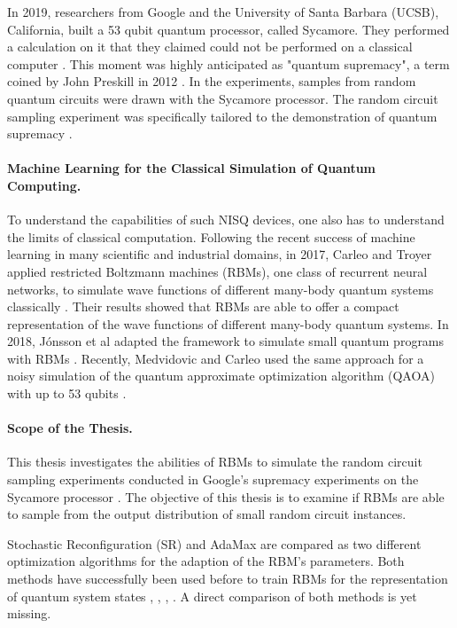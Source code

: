 In 2019, researchers from Google and the University of Santa Barbara (UCSB), California, built a 
53 qubit quantum processor, called Sycamore. They performed a calculation on it that they claimed could not be 
performed on a classical computer \cite{martines2019supremacy}. This moment was highly anticipated 
as "quantum supremacy", a term coined by John Preskill in 2012 \cite{preskill2012quantum}. In the experiments, 
samples from random quantum circuits were drawn with the Sycamore processor.
The random circuit sampling experiment was specifically tailored 
to the demonstration of quantum supremacy \cite{Boixo2018supremacy}.

\paragraph{Machine Learning for the Classical Simulation of Quantum Computing.}
To understand the capabilities of such NISQ devices, one also has to understand 
the limits of classical computation. Following the recent success of machine learning in 
many scientific and industrial domains, in 2017, Carleo and Troyer applied restricted Boltzmann machines (RBMs),
one class of recurrent neural networks,
to simulate wave functions of different many-body quantum systems classically \cite{carleo2017solving}.
Their results showed that RBMs are able to offer a compact representation of the wave functions 
of different many-body quantum systems. In 2018, 
J\'{o}nsson et al adapted the framework to simulate small quantum programs with 
RBMs \cite{jnsson2018neuralnetwork}. Recently, Medvidovic and Carleo used the 
same approach for a noisy simulation of the quantum approximate optimization algorithm 
(QAOA) with up to 53 qubits \cite{medvidovic2020classical}.

\paragraph{Scope of the Thesis.}
This thesis investigates the abilities of RBMs to simulate the random circuit sampling 
experiments conducted in Google's supremacy experiments on the Sycamore processor \cite{martines2019supremacy}. 
The objective of this thesis is to examine if RBMs are able to sample from the output distribution 
of small random circuit instances.

Stochastic Reconfiguration (SR) \cite{sorella1998green} and 
AdaMax \cite{kingma2014adam} are compared as two different optimization algorithms for the 
adaption of the RBM's parameters. Both methods have successfully been used before to train RBMs 
for the representation of quantum system states \cite{jnsson2018neuralnetwork}, \cite{carleo2017solving}, \cite{carleo2018constructing}, \cite{medvidovic2020classical}.
A direct comparison of both methods is yet missing. 

